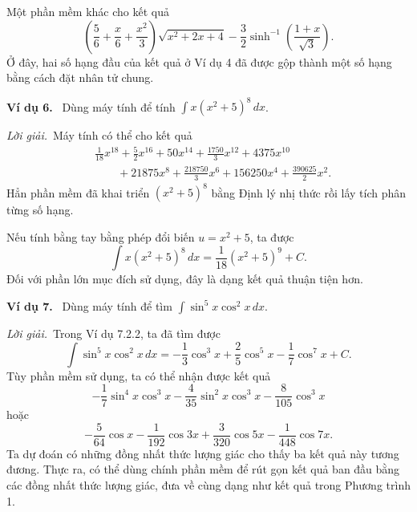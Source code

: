 \documentclass[12pt,a4paper]{article}
\newcommand{\ex}[1]{\par\medskip\noindent\textbf{Ví dụ #1.}\ }
\newcommand{\sol}{\par\nopagebreak[4]\noindent\textit{Lời giải.}\ }
\begin{document}
Một phần mềm khác cho kết quả
\[\left(\frac56+\frac x6+\frac{x^2}{3}\right)\sqrt{x^2+2x+4}
-\frac32\sinh^{-1}\left(\frac{1+x}{\sqrt3}\right).\]
Ở đây, hai số hạng đầu của kết quả ở Ví dụ 4 đã được gộp thành một số hạng bằng cách đặt nhân tử chung.

\ex{6} Dùng máy tính để tính $\displaystyle\int x(x^2+5)^8\,dx$.
\sol Máy tính có thể cho kết quả
\begin{align*}
&\frac1{18}x^{18}+\frac52x^{16}+50x^{14}+\frac{1750}{3}x^{12}+4375x^{10}\\
&\qquad+21875x^8+\frac{218750}{3}x^6+156250x^4+\frac{390625}{2}x^2.
\end{align*}
Hẳn phần mềm đã khai triển $(x^2+5)^8$ bằng Định lý nhị thức rồi lấy tích phân từng số hạng.

Nếu tính bằng tay bằng phép đổi biến $u=x^2+5$, ta được
\[\int x(x^2+5)^8\,dx=\frac1{18}(x^2+5)^9+C.\]
Đối với phần lớn mục đích sử dụng, đây là dạng kết quả thuận tiện hơn.

\ex{7} Dùng máy tính để tìm $\displaystyle\int\sin^5x\cos^2x\,dx$.
\sol Trong Ví dụ 7.2.2, ta đã tìm được
\begin{equation}
\int\sin^5x\cos^2x\,dx
=-\frac13\cos^3x+\frac25\cos^5x-\frac17\cos^7x+C.\tag{1}
\end{equation}
Tùy phần mềm sử dụng, ta có thể nhận được kết quả
\[-\frac17\sin^4x\cos^3x-\frac4{35}\sin^2x\cos^3x-\frac8{105}\cos^3x\]
hoặc
\[-\frac5{64}\cos x-\frac1{192}\cos3x+\frac3{320}\cos5x-\frac1{448}\cos7x.\]
Ta dự đoán có những đồng nhất thức lượng giác cho thấy ba kết quả này tương đương. Thực ra, có thể dùng chính phần mềm để rút gọn kết quả ban đầu bằng các đồng nhất thức lượng giác, đưa về cùng dạng như kết quả trong Phương trình 1.
\end{document}
